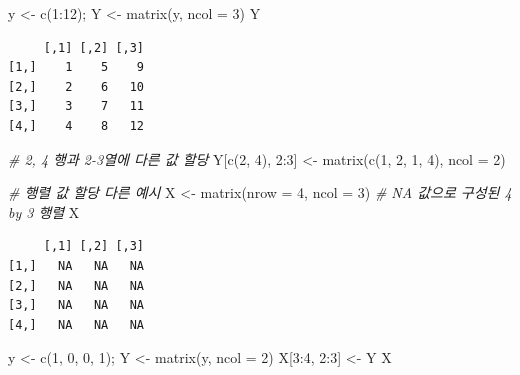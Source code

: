 \documentclass[
  11pt,
]{krantz}
\newenvironment{Shaded}{\begin{snugshade}}{\end{snugshade}}
\newcommand{\AttributeTok}[1]{\textcolor[rgb]{0.61,0.61,0.61}{#1}}
\newcommand{\CommentTok}[1]{\textcolor[rgb]{0.37,0.37,0.37}{\textit{#1}}}
\newcommand{\DecValTok}[1]{\textcolor[rgb]{0.06,0.06,0.06}{#1}}
\newcommand{\FunctionTok}[1]{\textcolor[rgb]{0,0,0}{#1}}
\newcommand{\NormalTok}[1]{#1}
\newcommand{\OtherTok}[1]{\textcolor[rgb]{0.37,0.37,0.37}{#1}}
\newcommand{\SpecialCharTok}[1]{\textcolor[rgb]{0,0,0}{#1}}
\begin{document}
\footnotesize

\begin{Shaded}
\begin{Highlighting}[]
\NormalTok{y }\OtherTok{\textless{}{-}} \FunctionTok{c}\NormalTok{(}\DecValTok{1}\SpecialCharTok{:}\DecValTok{12}\NormalTok{); Y }\OtherTok{\textless{}{-}} \FunctionTok{matrix}\NormalTok{(y, }\AttributeTok{ncol =} \DecValTok{3}\NormalTok{)}
\NormalTok{Y}
\end{Highlighting}
\end{Shaded}

\begin{verbatim}
     [,1] [,2] [,3]
[1,]    1    5    9
[2,]    2    6   10
[3,]    3    7   11
[4,]    4    8   12
\end{verbatim}

\begin{Shaded}
\begin{Highlighting}[]
\CommentTok{\# 2, 4 행과 2{-}3열에 다른 값 할당}
\NormalTok{Y[}\FunctionTok{c}\NormalTok{(}\DecValTok{2}\NormalTok{, }\DecValTok{4}\NormalTok{), }\DecValTok{2}\SpecialCharTok{:}\DecValTok{3}\NormalTok{] }\OtherTok{\textless{}{-}} \FunctionTok{matrix}\NormalTok{(}\FunctionTok{c}\NormalTok{(}\DecValTok{1}\NormalTok{, }\DecValTok{2}\NormalTok{, }\DecValTok{1}\NormalTok{, }\DecValTok{4}\NormalTok{), }\AttributeTok{ncol =} \DecValTok{2}\NormalTok{)}

\CommentTok{\# 행렬 값 할당 다른 예시}
\NormalTok{X }\OtherTok{\textless{}{-}} \FunctionTok{matrix}\NormalTok{(}\AttributeTok{nrow =} \DecValTok{4}\NormalTok{, }\AttributeTok{ncol =} \DecValTok{3}\NormalTok{) }\CommentTok{\# NA 값으로 구성된 4 by 3 행렬}
\NormalTok{X}
\end{Highlighting}
\end{Shaded}

\begin{verbatim}
     [,1] [,2] [,3]
[1,]   NA   NA   NA
[2,]   NA   NA   NA
[3,]   NA   NA   NA
[4,]   NA   NA   NA
\end{verbatim}

\begin{Shaded}
\begin{Highlighting}[]
\NormalTok{y }\OtherTok{\textless{}{-}} \FunctionTok{c}\NormalTok{(}\DecValTok{1}\NormalTok{, }\DecValTok{0}\NormalTok{, }\DecValTok{0}\NormalTok{, }\DecValTok{1}\NormalTok{); Y }\OtherTok{\textless{}{-}} \FunctionTok{matrix}\NormalTok{(y, }\AttributeTok{ncol =} \DecValTok{2}\NormalTok{)}
\NormalTok{X[}\DecValTok{3}\SpecialCharTok{:}\DecValTok{4}\NormalTok{, }\DecValTok{2}\SpecialCharTok{:}\DecValTok{3}\NormalTok{] }\OtherTok{\textless{}{-}}\NormalTok{ Y}
\NormalTok{X}
\end{Highlighting}
\end{Shaded}
\end{document}
